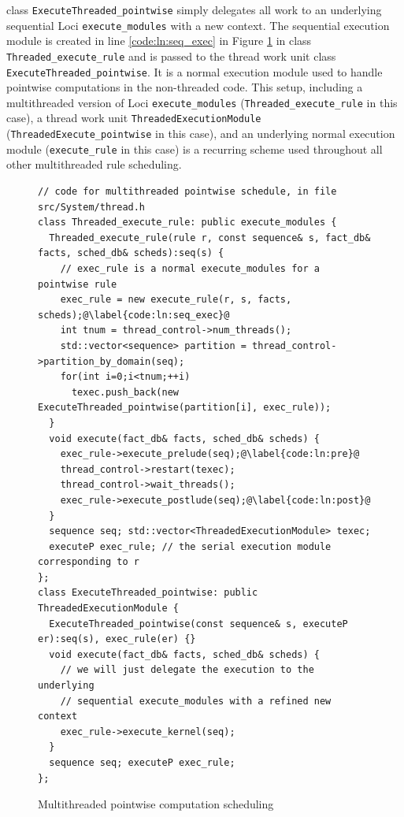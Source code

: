 \documentclass{article}
\begin{document}
class \lstinline{ExecuteThreaded_pointwise} simply delegates all work to
an underlying sequential Loci \lstinline{execute_modules} with a new
context.  The sequential execution module is created in line
\ref{code:ln:seq_exec} in Figure \ref{fig:pw} in class
\lstinline{Threaded_execute_rule} and is passed to the thread work unit
class \lstinline{ExecuteThreaded_pointwise}.  It is a normal execution
module used to handle pointwise computations in the non-threaded code.
This setup, including a multithreaded version of Loci
\lstinline{execute_modules} (\lstinline{Threaded_execute_rule} in this
case), a thread work unit \lstinline{ThreadedExecutionModule}
(\lstinline{ThreadedExecute_pointwise} in this case), and an underlying
normal execution module (\lstinline{execute_rule} in this case) is a
recurring scheme used throughout all other multithreaded rule
scheduling.

\begin{figure}[h]
\begin{lstlisting}[escapechar=@]
// code for multithreaded pointwise schedule, in file src/System/thread.h
class Threaded_execute_rule: public execute_modules {
  Threaded_execute_rule(rule r, const sequence& s, fact_db& facts, sched_db& scheds):seq(s) {
    // exec_rule is a normal execute_modules for a pointwise rule
    exec_rule = new execute_rule(r, s, facts, scheds);@\label{code:ln:seq_exec}@
    int tnum = thread_control->num_threads();
    std::vector<sequence> partition = thread_control->partition_by_domain(seq);
    for(int i=0;i<tnum;++i)
      texec.push_back(new ExecuteThreaded_pointwise(partition[i], exec_rule));
  }
  void execute(fact_db& facts, sched_db& scheds) {
    exec_rule->execute_prelude(seq);@\label{code:ln:pre}@
    thread_control->restart(texec);
    thread_control->wait_threads();
    exec_rule->execute_postlude(seq);@\label{code:ln:post}@
  }
  sequence seq; std::vector<ThreadedExecutionModule> texec;  
  executeP exec_rule; // the serial execution module corresponding to r
};
class ExecuteThreaded_pointwise: public ThreadedExecutionModule {
  ExecuteThreaded_pointwise(const sequence& s, executeP er):seq(s), exec_rule(er) {}
  void execute(fact_db& facts, sched_db& scheds) { 
    // we will just delegate the execution to the underlying 
    // sequential execute_modules with a refined new context
    exec_rule->execute_kernel(seq);
  }
  sequence seq; executeP exec_rule;
};
\end{lstlisting}
\caption{Multithreaded pointwise computation scheduling\label{fig:pw}}
\end{figure}
\end{document}
